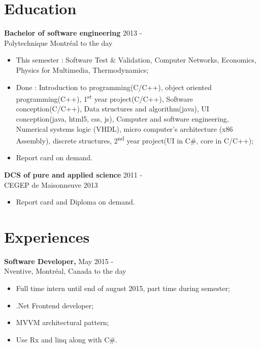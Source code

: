 \documentclass[margin]{res}
\begin{document}
\begin{resume}

  \section{Education}
  
  {\bf Bachelor of software engineering } \hfill 2013 -\\ 
  Polytechnique Montr\'{e}al \hfill to the day
  \begin{itemize} \itemsep -2pt
  \item This semester : Software Test \& Validation, Computer Networks, Economics, Physics for Multimedia, Thermodynamics;
  \item Done : Introduction to programming(C/C++), object oriented programming(C++), 1\textsuperscript{st} year project(C/C++), Software conception(C/C++), Data structures and algorithm(java), UI conception(java, html5, css, js), Computer and software engineering, Numerical systems logic (VHDL), micro computer’s architecture (x86 Assembly), discrete structures,  2\textsuperscript{nd} year project(UI in C\#, core in C/C++);
  \item Report card on demand.
  \end{itemize}
  
  
  {\bf DCS of pure and applied science} \hfill 2011 -\\
  CEGEP de Maisonneuve \hfill 2013
  \begin{itemize} \itemsep -2pt
   \item Report card and Diploma on demand.
  \end{itemize}


  
  \section{Experiences}

  {\bf Software Developer,} \hfill May 2015 -\\
  Nventive, Montr\'eal, Canada \hfill to the day
  \begin{itemize} \itemsep -2pt  %
  \item Full time intern until end of august 2015, part time during semester;
  \item .Net Frontend developer;
  \item MVVM  architectural pattern;
  \item Use Rx and linq along with C\#.
  \end{itemize}
  

\end{resume}
\end{document}
